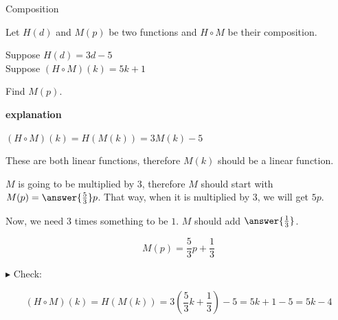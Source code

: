 \documentclass{ximera}
\begin{document}
\begin{example} Composition


Let $H(d)$ and $M(p)$ be two functions and $H \circ M$ be their composition.


Suppose $H(d) = 3 d - 5$ \\

Suppose $(H \circ M)(k) = 5 k + 1$


Find $M(p)$.



\textbf{\textcolor{red!75!green}{explanation}} 




$(H \circ M)(k) = H(M(k)) = 3 M(k) - 5 $  




These are both linear functions, therefore $M(k)$ should be a linear function.


$M$ is going to be multiplied by $3$, therefore $M$ should start with $M(p) = \answer{\frac{5}{3}}p$. That way, when it is multiplied by $3$, we will get $5p$.




Now, we need $3$ times something to be $1$.  $M$ should add $\answer{\frac{1}{3}}$.

\[  M(p) =    \frac{5}{3} p +     \frac{1}{3} \]



$\blacktriangleright$ Check: 


\[    (H \circ M)(k) = H(M(k)) = 3 \left( \frac{5}{3} k + \frac{1}{3} \right) - 5 =    5 k + 1 -5 = 5 k -4    \]





\end{example}
\end{document}
